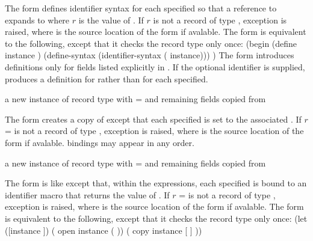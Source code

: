 The  form defines identifier syntax for each specified 
so that a reference to  expands to 
where $r$ is the value of .
If $r$ is not a record of type , exception
 is raised, where
 is the source location of the  form if avalable.
The  form is equivalent to the following, except that it
checks the record type only once:
\antipar\codebegin
(begin
  (define instance )
  (define-syntax  (identifier-syntax (  instance)))
  \etc{})
\codeend\antipar
The  form introduces definitions only for fields listed explicitly in .
If the optional  identifier is supplied,  produces
a definition for  rather than  for
each  specified.

\begin{syntax}
\end{syntax}
\returns{} a new instance of record type  with  =
 \etc{} and remaining fields copied from 

The  form creates a copy of  except that
each specified  is set to the associated . If
$r$ =  is not a record of type , exception
 is raised, where
 is the source location of the  form if
avalable.   bindings may appear in any order.

\begin{syntax}
\end{syntax}
\returns{} a new instance of record type  with  =
 \etc{} and remaining fields copied from 

The  form is like  except that, within the  expressions,
each specified  is bound to an identifier macro that returns the value of .
If $r$ =  is not a record of type , exception
 is raised, where
 is the source location of the  form if avalable.
The  form is equivalent to the following, except that it
checks the record type only once:
\antipar\codebegin
(let ([instance ])
  ( open instance ( \etc{}))
  ( copy instance [ ] \etc{}))
\codeend\antipar

